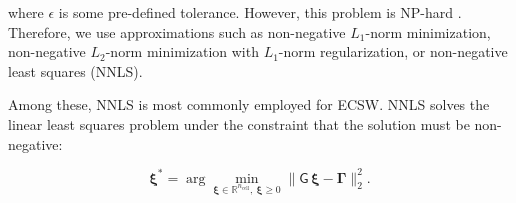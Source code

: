 \documentclass[11pt]{article}
\newcommand{\mat}[1]{\mathsf{#1}}
\begin{document}
        where $\epsilon$ is some pre-defined tolerance.
        However, this problem is NP-hard \cite{farhat2014dimensional}.
        Therefore, we use approximations such as non-negative $L_1$-norm minimization, non-negative $L_2$-norm minimization with $L_1$-norm regularization, or non-negative least squares (NNLS).

        Among these, NNLS \cite{NNLSLawsonHanson1995} is most commonly employed for ECSW.
        NNLS solves the linear least squares problem under the constraint that the solution must be non-negative:

        \begin{equation}
        \boldsymbol{\xi}^\ast = \arg \min_{\boldsymbol{\xi} \in \mathbb{R}^{n_{\text{cell}}},\ \boldsymbol{\xi} \geq 0} \| \mat{G}\, \boldsymbol{\xi} - \boldsymbol{\Gamma} \|_2^2.
        \label{eq:NNLS}
        \end{equation}
\end{document}
